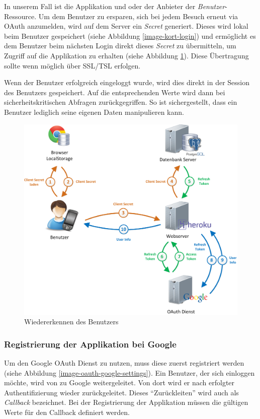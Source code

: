 In unserem Fall ist \kort{} die Applikation und  oder  der Anbieter der \emph{Benutzer}-Ressource.
Um dem Benutzer zu ersparen, sich bei jedem Besuch erneut via \gls{OAuth} anzumelden, wird auf dem Server ein \emph{Secret} generiert.
Dieses wird lokal beim Benutzer gespeichert (siehe Abbildung \ref{image-kort-login}) und ermöglicht es dem Benutzer beim nächsten Login direkt dieses \emph{Secret} zu übermitteln, um Zugriff auf die Applikation zu erhalten (siehe Abbildung \ref{image-kort-relogin}).
Diese Übertragung sollte wenn möglich über SSL/TSL erfolgen.

Wenn der Benutzer erfolgreich eingeloggt wurde, wird dies direkt in der Session des Benutzers gespeichert.
Auf die entsprechenden Werte wird dann bei sicherheitskritischen Abfragen zurückgegriffen.
So ist sichergestellt, dass ein Benutzer lediglich seine eigenen Daten manipulieren kann.

\begin{figure}[H]
	\centering
	\includegraphics[scale=0.4]{images/implementation/backend/kort-relogin}
	\caption{Wiedererkennen des Benutzers}
	\label{image-kort-relogin}
\end{figure}

\subsubsection{Registrierung der Applikation bei Google}
Um den Google \gls{OAuth} Dienst zu nutzen, muss diese zuerst registriert werden (siehe Abbildung \ref{image-oauth-google-settings}).
Ein Benutzer, der sich einloggen möchte, wird von \kort{} zu Google weitergeleitet.
Von dort wird er nach erfolgter Authentifizierung wieder zurückgeleitet.
Dieses "`Zurückleiten"' wird auch als \emph{Callback} bezeichnet.
Bei der Registrierung der Applikation müssen die gültigen Werte für den Callback definiert werden.

